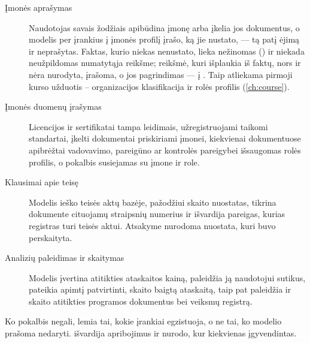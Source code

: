 \begin{description}
  \item[Įmonės aprašymas] Naudotojas savais žodžiais apibūdina įmonę arba įkelia jos
    dokumentus, o modelis per įrankius į įmonės profilį įrašo, ką jie nustato, --- tą patį ėjimą
    ir neprašytas. Faktas, kurio niekas nenustato, lieka nežinomas () ir niekada
    neužpildomas numatytąja reikšme; reikšmė, kuri išplaukia iš faktų, nors ir nėra nurodyta,
    įrašoma, o jos pagrindimas --- į . Taip atliekama pirmoji kurso užduotis --
    organizacijos klasifikacija ir rolės profilis (\cref{ch:course}).
  \item[Įmonės duomenų įrašymas] Licencijos ir sertifikatai tampa leidimais, užregistruojami
    taikomi standartai, įkelti dokumentai priskiriami įmonei, kiekvienai dokumentuose apibrėžtai
    vadovavimo, pareigūno ar kontrolės pareigybei išsaugomas rolės profilis, o pokalbis
    susiejamas su įmone ir role.
  \item[Klausimai apie teisę] Modelis ieško teisės aktų bazėje, pažodžiui skaito nuostatas,
    tikrina dokumente cituojamų straipsnių numerius ir išvardija pareigas, kurias registras turi
    teisės aktui. Atsakyme nurodoma nuostata, kuri buvo perskaityta.
  \item[Analizių paleidimas ir skaitymas] Modelis įvertina atitikties ataskaitos kainą, paleidžia
    ją naudotojui sutikus, pateikia apimtį patvirtinti, skaito baigtą ataskaitą, taip pat
    paleidžia ir skaito atitikties programos dokumentus bei veiksmų registrą.
\end{description}

Ko pokalbis negali, lemia tai, kokie įrankiai egzistuoja, o ne tai, ko modelio prašoma
nedaryti.  išvardija apribojimus ir nurodo, kur kiekvienas įgyvendintas.

